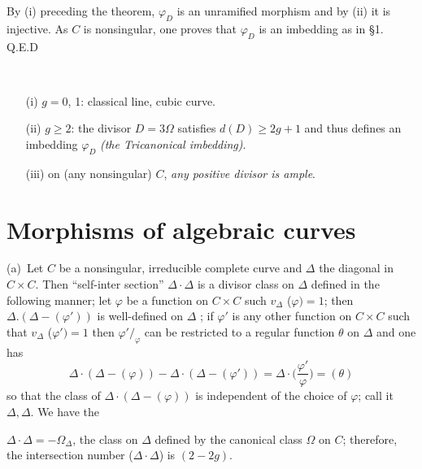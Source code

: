 By (i) preceding the theorem, $\varphi_{ D}$ is an unramified morphism
and by (ii) it is injective. As $C$ is nonsingular, one proves that
$\varphi_{ D}$ is an imbedding as in \S 1. \hfill Q.E.D

\begin{examples*}
~

  \begin{enumerate}
  \item[(i)] $g = 0$, 1: classical line, cubic curve.
  \item[(ii)] $g \ge 2$: the divisor $D = 3 \Omega $ satisfies $d(D)
    \ge  2g + 1$ and thus defines an imbedding $\varphi_{ D}$ {\em
      (the Tricanonical imbedding)}. 
  \item[(iii)] on (any nonsingular) $C$, {\em any positive divisor is ample}.
  \end{enumerate}	
\end{examples*}	

\section{Morphisms of algebraic curves}\label{chap2:sec4}%

(a)~\pageoriginale Let $C$ be a nonsingular, irreducible complete curve and $\Delta$
the diagonal in $C \times C$. Then ``self-inter section'' $\Delta
\cdot\Delta$ is a divisor class on $\Delta$ defined in the following
manner; let $\varphi$ be a function on $C \times C$ such $v_\Delta$
($\varphi )= 1$; then $\Delta . (\Delta - (\varphi '))$ is
well-defined on $\Delta$ ; if $\varphi'$ is any other function on $C
\times C $ such that $v_\Delta$ ($\varphi')= 1 $ then
$\varphi'/_\varphi$ can be restricted to a regular function $\theta$
on $\Delta$ and one has 
$$
\Delta \cdot (\Delta -(\varphi )) - \Delta \cdot (\Delta - (\varphi' )) =
\Delta\cdot\big(\frac{\varphi'}{\varphi}\big)=(\theta) 
$$	
so that the class of $\Delta\cdot(\Delta - (\varphi ))$ is independent of
the choice of $\varphi$; call it $\Delta , \Delta$. We have the  
\begin{theorem*}%
  $\Delta \cdot \Delta = -\Omega_\Delta$, the class on $\Delta$ defined by
  the canonical class $\Omega$ on $C$; therefore, the intersection
  number ($\Delta \cdot \Delta$) is $(2 - 2g)$. 
\end{theorem*}


